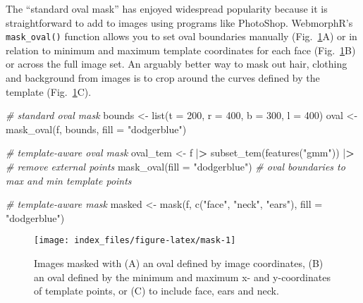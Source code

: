 \documentclass[
  doc,floatsintext]{apa6}
\newenvironment{Shaded}{\begin{snugshade}}{\end{snugshade}}
\newcommand{\AttributeTok}[1]{\textcolor[rgb]{0.77,0.63,0.00}{#1}}
\newcommand{\CommentTok}[1]{\textcolor[rgb]{0.56,0.35,0.01}{\textit{#1}}}
\newcommand{\DecValTok}[1]{\textcolor[rgb]{0.00,0.00,0.81}{#1}}
\newcommand{\ErrorTok}[1]{\textcolor[rgb]{0.64,0.00,0.00}{\textbf{#1}}}
\newcommand{\FunctionTok}[1]{\textcolor[rgb]{0.00,0.00,0.00}{#1}}
\newcommand{\NormalTok}[1]{#1}
\newcommand{\OtherTok}[1]{\textcolor[rgb]{0.56,0.35,0.01}{#1}}
\newcommand{\SpecialCharTok}[1]{\textcolor[rgb]{0.00,0.00,0.00}{#1}}
\newcommand{\StringTok}[1]{\textcolor[rgb]{0.31,0.60,0.02}{#1}}
\begin{document}
The ``standard oval mask'' has enjoyed widespread popularity because it is straightforward to add to images using programs like PhotoShop. WebmorphR's \texttt{mask\_oval()} function allows you to set oval boundaries manually (Fig.~\ref{fig:mask}A) or in relation to minimum and maximum template coordinates for each face (Fig.~\ref{fig:mask}B) or across the full image set. An arguably better way to mask out hair, clothing and background from images is to crop around the curves defined by the template (Fig.~\ref{fig:mask}C).

\begin{Shaded}
\begin{Highlighting}[]
\CommentTok{\# standard oval mask}
\NormalTok{bounds }\OtherTok{\textless{}{-}} \FunctionTok{list}\NormalTok{(}\AttributeTok{t =} \DecValTok{200}\NormalTok{, }\AttributeTok{r =} \DecValTok{400}\NormalTok{, }\AttributeTok{b =} \DecValTok{300}\NormalTok{, }\AttributeTok{l =} \DecValTok{400}\NormalTok{)}
\NormalTok{oval }\OtherTok{\textless{}{-}} \FunctionTok{mask\_oval}\NormalTok{(f, bounds, }\AttributeTok{fill =} \StringTok{"dodgerblue"}\NormalTok{)}

\CommentTok{\# template{-}aware oval mask}
\NormalTok{oval\_tem }\OtherTok{\textless{}{-}}\NormalTok{ f }\SpecialCharTok{|}\ErrorTok{\textgreater{}}
  \FunctionTok{subset\_tem}\NormalTok{(}\FunctionTok{features}\NormalTok{(}\StringTok{"gmm"}\NormalTok{)) }\SpecialCharTok{|}\ErrorTok{\textgreater{}} \CommentTok{\# remove external points}
  \FunctionTok{mask\_oval}\NormalTok{(}\AttributeTok{fill =} \StringTok{"dodgerblue"}\NormalTok{) }\CommentTok{\# oval boundaries to max and min template points}

\CommentTok{\# template{-}aware mask}
\NormalTok{masked }\OtherTok{\textless{}{-}} \FunctionTok{mask}\NormalTok{(f, }\FunctionTok{c}\NormalTok{(}\StringTok{"face"}\NormalTok{, }\StringTok{"neck"}\NormalTok{, }\StringTok{"ears"}\NormalTok{), }\AttributeTok{fill =} \StringTok{"dodgerblue"}\NormalTok{)}
\end{Highlighting}
\end{Shaded}

\begin{figure}
\texttt{[image: index\_files/figure-latex/mask-1]} \caption{Images masked with (A) an oval defined by image coordinates, (B) an oval defined by the minimum and maximum x- and y-coordinates of template points, or (C) to include face, ears and neck.}\label{fig:mask}
\end{figure}
\end{document}
